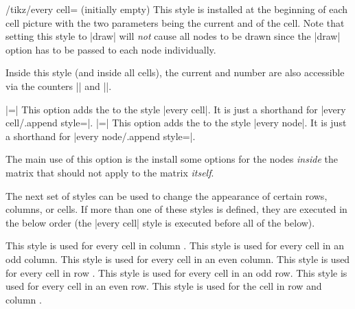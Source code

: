 \begin{stylekey}{/tikz/every cell= (initially \normalfont empty)}
  This style is installed at the beginning of each cell picture with
  the two parameters being the current  and  of
  the cell. Note that setting this style to |draw| will \emph{not}
  cause all nodes to be drawn since the |draw| option has to be passed
  to each node individually.

  Inside this style (and inside all cells), the current  and
   number are also accessible via the counters
  |\pgfmatrixcurrentrow| and |\pgfmatrixcurrentcolumn|.   
\end{stylekey}

\begin{itemize}
  |=| This option adds the
   to the style |every cell|. It is just a shorthand for
  |every cell/.append style=|.
  |=| This option adds the
   to the style |every node|. It is just a shorthand for
  |every node/.append style=|.

  The main use of this option is the install some options for the
  nodes \emph{inside} the matrix that should not apply to the matrix
  \emph{itself}. 
\end{itemize}

\begin{codeexample}[]
\end{codeexample}

The next set of styles can be used to change the appearance of certain
rows, columns, or cells. If more than one of these styles is defined,
they are executed in the below order (the |every cell| style is
executed before all of the below).
\begin{itemize}
  This style is used for every cell in column .
  This style is used for every cell in an odd column.
  This style is used for every cell in an even column.
  This style is used for every cell in row .
  This style is used for every cell in an odd row.
  This style is used for every cell in an even row.
  This style is used for the cell in row  and column
  .
\end{itemize}


